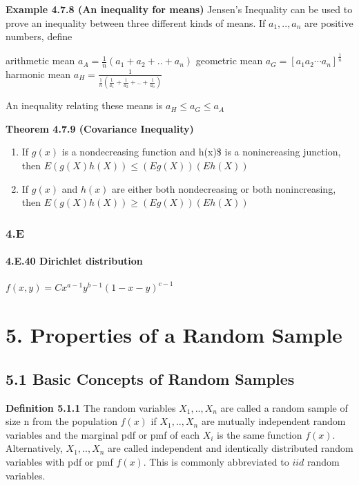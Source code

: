 \documentclass[6pt,twocolumn,Portrait]{article}
\let\oldparagraph\paragraph
\renewcommand{\paragraph}[1]{\oldparagraph{#1}\mbox{}}
\begin{document}
\textbf{Example 4.7.8 (An inequality for means)} Jensen's Inequality can
be used to prove an inequality between three different kinds of means.
If \(a_1,..,a_n\) are positive numbers, define

arithmetic mean \(a_A=\frac1n(a_1+a_2+..+a_n)\) geometric mean
\(a_G=[a_1a_2\cdots a_n]^{\frac1n}\) harmonic mean
\(a_H=\frac{1}{\frac1n(\frac1{a_1}+\frac1{a_2}+..+\frac1{a_n})}\)

An inequality relating these means is \(a_H\le a_G\le a_A\)

\textbf{Theorem 4.7.9 (Covariance Inequality)}

\begin{enumerate}
\def\labelenumi{\alph{enumi}.}
\item
  If \(g(x)\) is a nondecreasing function and h(x)\$ is a nonincreasing
  junction, then \(E(g(X)h(X))\le(Eg(X))(Eh(X))\)
\item
  If \(g(x)\) and \(h(x)\) are either both nondecreasing or both
  nonincreasing, then \(E(g(X)h(X))\ge(Eg(X))(Eh(X))\)
\end{enumerate}

\hypertarget{e-1}{%
\subsubsection{4.E}\label{e-1}}

\hypertarget{Dirichlet}{%
\paragraph{4.E.40 Dirichlet distribution}\label{Dirichlet}}

\(f(x,y)=Cx^{a-1}y^{b-1}(1-x-y)^{c-1}\)

\hypertarget{samp}{%
\section{5. Properties of a Random Sample}\label{samp}}

\hypertarget{basic-concepts-of-random-samples}{%
\subsection{5.1 Basic Concepts of Random
Samples}\label{basic-concepts-of-random-samples}}

\textbf{Definition 5.1.1} The random variables \(X_1,..,X_n\) are called
a random sample of size n from the population \(f(x)\) if \(X_1,..,X_n\)
are mutually independent random variables and the marginal pdf or pmf of
each \(X_i\) is the same function \(f(x)\). Alternatively,
\(X_1,..,X_n\) are called independent and identically distributed random
variables with pdf or pmf \(f(x)\). This is commonly abbreviated to
\(iid\) random variables.
\end{document}
